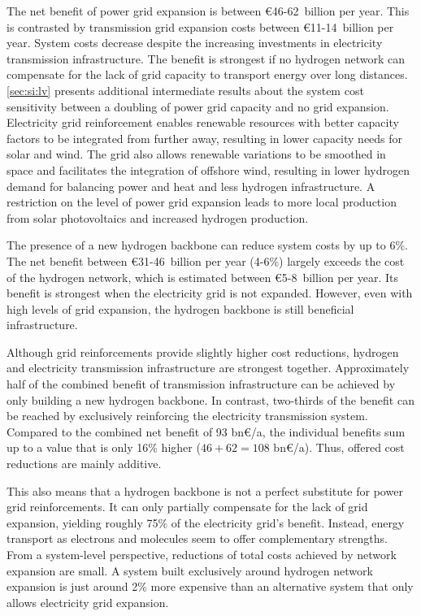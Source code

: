 The net benefit of power grid expansion is between \euro46-62~billion per year.
This is contrasted by transmission grid expansion costs between
\euro11-14~billion per year. System costs decrease despite the increasing
investments in electricity transmission infrastructure. The benefit is strongest
if no hydrogen network can compensate for the lack of grid capacity to transport
energy over long distances. \cref{sec:si:lv} presents additional intermediate
results about the system cost sensitivity between a doubling of power grid
capacity and no grid expansion. Electricity grid reinforcement enables renewable
resources with better capacity factors to be integrated from further away,
resulting in lower capacity needs for solar and wind. The grid also allows
renewable variations to be smoothed in space and facilitates the integration of
offshore wind, resulting in lower hydrogen demand for balancing power and heat
and less hydrogen infrastructure. A restriction on the level of power grid
expansion leads to more local production from solar photovoltaics and increased
hydrogen production.


The presence of a new hydrogen backbone can reduce system costs by up to 6\%.
The net benefit between \euro31-46~billion per year (4-6\%) largely exceeds the
cost of the hydrogen network, which is estimated between \euro5-8~billion per
year. Its benefit is strongest when the electricity grid is not expanded.
However, even with high levels of grid expansion, the hydrogen backbone is still
beneficial infrastructure.


Although grid reinforcements provide slightly higher cost reductions, hydrogen and
electricity transmission infrastructure are strongest together. Approximately
half of the combined benefit of transmission infrastructure can be achieved by
only building a new hydrogen backbone. In contrast, two-thirds of the benefit
can be reached by exclusively reinforcing the electricity transmission system.
Compared to the combined net benefit of 93 bn\euro/a, the individual benefits
sum up to a value that is only 16\% higher ($46+62=108$ bn\euro/a). Thus,
offered cost reductions are mainly additive.


This also means that a hydrogen backbone is not a perfect substitute for power
grid reinforcements. It can only partially compensate for the lack of grid
expansion, yielding roughly 75\% of the electricity grid's benefit. Instead,
energy transport as electrons and molecules seem to offer complementary
strengths. From a system-level perspective, reductions of total costs achieved
by network expansion are small. A system built exclusively around hydrogen
network expansion is just around 2\% more expensive than an alternative system
that only allows electricity grid expansion. %

